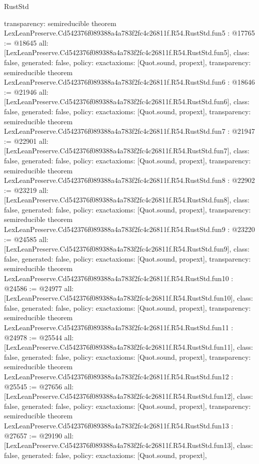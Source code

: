 \begin{lexlean}{RustStd}
\begin{coremodule}
{  transparency: semireducible
}
theorem LexLeanPreserve.Cd542376f089388a4a783f2fc4c26811f.R54.RustStd.fun5 : @17765 := @18645 {
  all: [LexLeanPreserve.Cd542376f089388a4a783f2fc4c26811f.R54.RustStd.fun5],
  class: false,
  generated: false,
  policy: exact{axioms: [Quot.sound, propext]},
  transparency: semireducible
}
theorem LexLeanPreserve.Cd542376f089388a4a783f2fc4c26811f.R54.RustStd.fun6 : @18646 := @21946 {
  all: [LexLeanPreserve.Cd542376f089388a4a783f2fc4c26811f.R54.RustStd.fun6],
  class: false,
  generated: false,
  policy: exact{axioms: [Quot.sound, propext]},
  transparency: semireducible
}
theorem LexLeanPreserve.Cd542376f089388a4a783f2fc4c26811f.R54.RustStd.fun7 : @21947 := @22901 {
  all: [LexLeanPreserve.Cd542376f089388a4a783f2fc4c26811f.R54.RustStd.fun7],
  class: false,
  generated: false,
  policy: exact{axioms: [Quot.sound, propext]},
  transparency: semireducible
}
theorem LexLeanPreserve.Cd542376f089388a4a783f2fc4c26811f.R54.RustStd.fun8 : @22902 := @23219 {
  all: [LexLeanPreserve.Cd542376f089388a4a783f2fc4c26811f.R54.RustStd.fun8],
  class: false,
  generated: false,
  policy: exact{axioms: [Quot.sound, propext]},
  transparency: semireducible
}
theorem LexLeanPreserve.Cd542376f089388a4a783f2fc4c26811f.R54.RustStd.fun9 : @23220 := @24585 {
  all: [LexLeanPreserve.Cd542376f089388a4a783f2fc4c26811f.R54.RustStd.fun9],
  class: false,
  generated: false,
  policy: exact{axioms: [Quot.sound, propext]},
  transparency: semireducible
}
theorem LexLeanPreserve.Cd542376f089388a4a783f2fc4c26811f.R54.RustStd.fun10 : @24586 := @24977 {
  all: [LexLeanPreserve.Cd542376f089388a4a783f2fc4c26811f.R54.RustStd.fun10],
  class: false,
  generated: false,
  policy: exact{axioms: [Quot.sound, propext]},
  transparency: semireducible
}
theorem LexLeanPreserve.Cd542376f089388a4a783f2fc4c26811f.R54.RustStd.fun11 : @24978 := @25544 {
  all: [LexLeanPreserve.Cd542376f089388a4a783f2fc4c26811f.R54.RustStd.fun11],
  class: false,
  generated: false,
  policy: exact{axioms: [Quot.sound, propext]},
  transparency: semireducible
}
theorem LexLeanPreserve.Cd542376f089388a4a783f2fc4c26811f.R54.RustStd.fun12 : @25545 := @27656 {
  all: [LexLeanPreserve.Cd542376f089388a4a783f2fc4c26811f.R54.RustStd.fun12],
  class: false,
  generated: false,
  policy: exact{axioms: [Quot.sound, propext]},
  transparency: semireducible
}
theorem LexLeanPreserve.Cd542376f089388a4a783f2fc4c26811f.R54.RustStd.fun13 : @27657 := @29190 {
  all: [LexLeanPreserve.Cd542376f089388a4a783f2fc4c26811f.R54.RustStd.fun13],
  class: false,
  generated: false,
  policy: exact{axioms: [Quot.sound, propext]},
}
\end{coremodule}
\end{lexlean}
